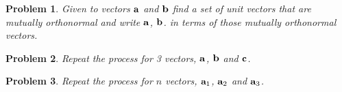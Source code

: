 \documentclass[times,singlecolumn]{article}
\newtheorem{prob}{Problem}
\begin{document}
\begin{prob}
  Given to vectors $\mathbf{a}$ and $\mathbf{b}$ find a set of unit vectors that are
  mutually orthonormal and write $\mathbf{a}$, $\mathbf{b}$. in terms of those mutually orthonormal vectors.
\end{prob}

\newpage
\begin{prob}
  Repeat the process for 3 vectors, $\mathbf{a}$, $\mathbf{b}$ and $\mathbf{c}$.
\end{prob}

\newpage
\begin{prob}
  Repeat the process for $n$ vectors, $\mathbf{a}_1$, $\mathbf{a}_2$ and $\mathbf{a}_3$.
\end{prob}
\end{document}
